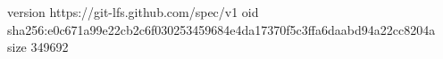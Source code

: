 version https://git-lfs.github.com/spec/v1
oid sha256:e0c671a99e22cb2c6f030253459684e4da17370f5c3ffa6daabd94a22cc8204a
size 349692
